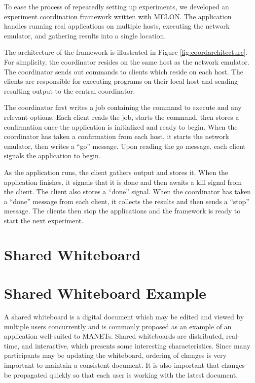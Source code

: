 To ease the process of repeatedly setting up experiments, we developed an experiment coordination framework written with MELON. The application handles running real applications on multiple hosts, executing the network emulator, and gathering results into a single location.

The architecture of the framework is illustrated in Figure \ref{fig:coordarchitecture}. For simplicity, the coordinator resides on the same host as the network emulator. The coordinator sends out commands to clients which reside on each host. The clients are responsible for executing programs on their local host and sending resulting output to the central coordinator.

The coordinator first writes a job containing the command to execute and any relevant options. Each client reads the job, starts the command, then stores a confirmation once the application is initialized and ready to begin. When the coordinator has taken a confirmation from each host, it starts the network emulator, then writes a ``go'' message. Upon reading the go message, each client signals the application to begin.

As the application runs, the client gathers output and stores it. When the application finishes, it signals that it is done and then awaits a kill signal from the client. The client also stores a ``done'' signal. When the coordinator has taken a ``done'' message from each client, it collects the results and then sends a ``stop'' message. The clients then stop the applications and the framework is ready to start the next experiment.

\section{Shared Whiteboard}

\section{Shared Whiteboard Example}\label{sec:wb}

A shared whiteboard is a digital document which may be edited and viewed by multiple users concurrently and is commonly proposed as an example of an application well-suited to MANETs\cite{wb5}\cite{wb6}. Shared whiteboards are distributed, real-time, and interactive, which presents some interesting characteristics. Since many participants may be updating the whiteboard, ordering of changes is very important to maintain a consistent document. It is also important that changes be propagated quickly so that each user is working with the latest document.

